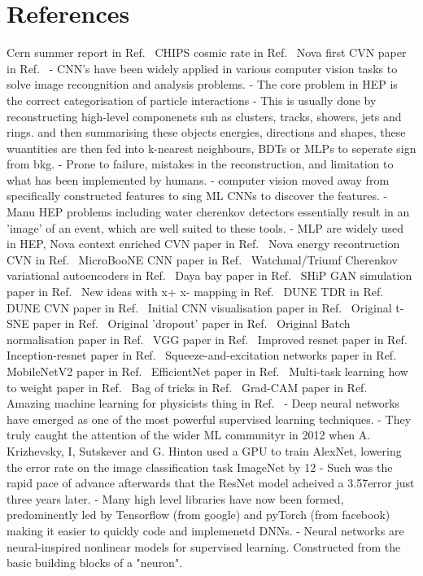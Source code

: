 \section{References}

Cern summer report in Ref.~\cite{theodore2016}
CHIPS cosmic rate in Ref.~\cite{son2013}
Nova first CVN paper in Ref.~\cite{aurisano2016}
- CNN's have been widely applied in various computer vision tasks to solve image recongnition and analysis problems.
- The core problem in HEP is the correct categorisation of particle interactions
- This is usually done by reconstructing high-level componenets suh as clusters, tracks, showers, jets and rings. and
then summarising these objects energies, directions and shapes, these wuantities are then fed into k-nearest neighbours,
BDTs or MLPs to seperate sign from bkg.
- Prone to failure, mistakes in the reconstruction, and limitation to what has been implemented by humans.
- computer vision moved away from specifically constructed features to sing ML CNNs to discover the features.
- Manu HEP problems including water cherenkov detectors essentially result in an 'image' of an event, which are well suited to these tools.
- MLP are widely used in HEP,
Nova context enriched CVN paper in Ref.~\cite{psihas2019}
Nova energy recontruction CVN in Ref.~\cite{baldi2019}
MicroBooNE CNN paper in Ref.~\cite{acciarri2017}
Watchmal/Triumf Cherenkov variational autoencoders in Ref.~\cite{abhishek2019}
Daya bay paper in Ref.~\cite{racah2016}
SHiP GAN simulation paper in Ref.~\cite{ahdida2019}
New ideas with x+ x- mapping in Ref.~\cite{berns2020}
DUNE TDR in Ref.~\cite{abi2020}
DUNE CVN paper in Ref.~\cite{collaboration2020}
Initial CNN visualisation paper in Ref.~\cite{zeiler2013}
Original t-SNE paper in Ref.~\cite{maaten2008}
Original 'dropout' paper in Ref.~\cite{hinton2012}
Original Batch normalisation paper in Ref.~\cite{ioffe2015}
VGG paper in Ref.~\cite{simonyan2014}
Improved resnet paper in Ref.~\cite{he2016}
Inception-resnet paper in Ref.~\cite{szegedy2016}
Squeeze-and-excitation networks paper in Ref.~\cite{hu2017}
MobileNetV2 paper in Ref.~\cite{sandler2018}
EfficientNet paper in Ref.~\cite{tan2019}
Multi-task learning how to weight paper in Ref.~\cite{kendall2017}
Bag of tricks in Ref.~\cite{he2018}
Grad-CAM paper in Ref.~\cite{elvaraju2019}
Amazing machine learning for physicists thing in Ref.~\cite{mehta2019}
- Deep neural networks have emerged as one of the most powerful supervised learning techniques.
- They truly caught the attention of the wider ML communityr in 2012 when A. Krizhevsky, I, Sutskever and G. Hinton used a GPU to train
AlexNet, lowering the error rate on the image classification task ImageNet by 12%
- Such was the rapid pace of advance afterwards that the ResNet model acheived a 3.57\percent error just three years later.
- Many high level libraries have now been formed, predominently led by Tensorflow (from google) and pyTorch (from facebook) making it easier to quickly code and implemenetd DNNs.
- Neural networks are neural-inspired nonlinear models for supervised learning. Constructed from the basic building blocks of a "neuron".